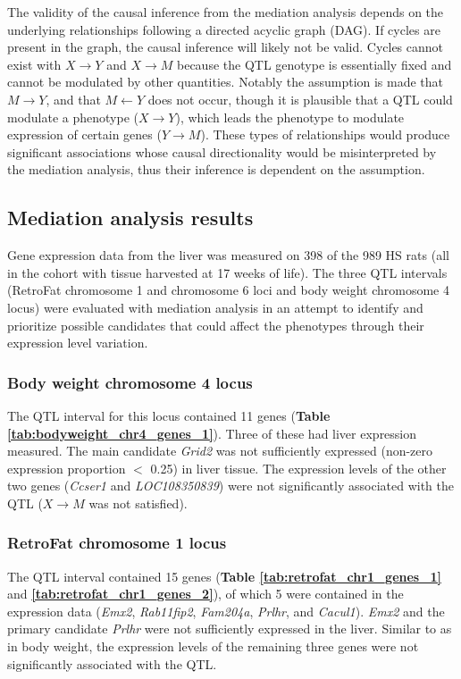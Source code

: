 The validity of the causal inference from the mediation analysis depends on the underlying relationships following a directed acyclic graph (DAG). If cycles are present in the graph, the causal inference will likely not be valid. Cycles cannot exist with $X \rightarrow Y$ and $X \rightarrow M$ because the QTL genotype is essentially fixed and cannot be modulated by other quantities. Notably the assumption is made that $M \rightarrow Y$, and that $M \leftarrow Y$ does not occur, though it is plausible that a QTL could modulate a phenotype ($X \rightarrow Y$), which leads the phenotype to modulate expression of certain genes ($Y \rightarrow M$). These types of relationships would produce significant associations whose causal directionality would be misinterpreted by the mediation analysis, thus their inference is dependent on the assumption.

\subsection{Mediation analysis results}

Gene expression data from the liver was measured on 398 of the 989 HS rats (all in the cohort with tissue harvested at 17 weeks of life). The three QTL intervals (RetroFat chromosome 1 and chromosome 6 loci and body weight chromosome 4 locus) were evaluated with mediation analysis in an attempt to identify and prioritize possible candidates that could affect the phenotypes through their expression level variation. 

\subsubsection{Body weight chromosome 4 locus}

The QTL interval for this locus contained 11 genes (\textbf{Table \ref{tab:bodyweight_chr4_genes_1}}). Three of these had liver expression measured. The main candidate \textit{Grid2} was not sufficiently expressed (non-zero expression proportion $<$ 0.25) in liver tissue. The expression levels of the other two genes (\textit{Ccser1} and \textit{LOC108350839}) were not significantly associated with the QTL ($X \rightarrow M$ was not satisfied).

\subsubsection{RetroFat chromosome 1 locus}

The QTL interval contained 15 genes (\textbf{Table \ref{tab:retrofat_chr1_genes_1}} and \textbf{\ref{tab:retrofat_chr1_genes_2}}), of which 5 were contained in the expression data (\textit{Emx2}, \textit{Rab11fip2}, \textit{Fam204a}, \textit{Prlhr}, and \textit{Cacul1}). \textit{Emx2} and the primary candidate \textit{Prlhr} were not sufficiently expressed in the liver. Similar to as in body weight, the  expression levels of the remaining three genes were not significantly associated with the QTL.


